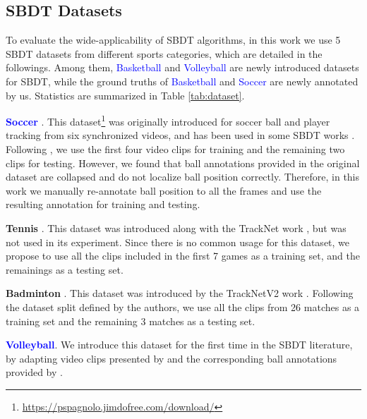 \documentclass{bmvc2k}
\begin{document}
\subsection{SBDT Datasets}
\label{sec:dataset:dataset}
To evaluate the wide-applicability of SBDT algorithms, in this work we use 5 SBDT datasets from different sports categories, which are detailed in the followings.
Among them, \textcolor{blue}{Basketball} and \textcolor{blue}{Volleyball} are newly introduced datasets for SBDT, while the ground truths of \textcolor{blue}{Basketball} and \textcolor{blue}{Soccer} are newly annotated by us.
Statistics are summarized in Table \ref{tab:dataset}.
\par
\vspace{1mm}
\noindent \textbf{\textcolor{blue}{Soccer}} \cite{dorazio+2009avss}.
This dataset\footnote{\url{https://pspagnolo.jimdofree.com/download/}} was originally introduced for soccer ball and player tracking from six synchronized videos, and has been used in some SBDT works \cite{komorowski+2019visapp,komorowski+2020visapp,wang+2014cviu}.
Following \cite{komorowski+2019visapp,komorowski+2020visapp}, we use the first four video clips for training and the remaining two clips for testing.
However, we found that ball annotations provided in the original dataset are collapsed and do not localize ball position correctly.
Therefore, in this work we manually re-annotate ball position to all the frames and use the resulting annotation for training and testing.
\par
\vspace{1mm}
\noindent \textbf{Tennis} \cite{huang+2019avss}.
This dataset was introduced along with the TrackNet work \cite{huang+2019avss}, but was not used in its experiment.
Since there is no common usage for this dataset, we propose to use all the clips included in the first 7 games
as a training set, and the remainings as a testing set.
\par
\vspace{1mm}
\noindent \textbf{Badminton} \cite{sun+2020icpai}.
This dataset was introduced by the TrackNetV2 work \cite{sun+2020icpai}.
Following the dataset split defined by the authors, we use all the clips from 26 matches as a training set and the remaining 3 matches as a testing set.
\par
\noindent \textbf{\textcolor{blue}{Volleyball}}.
We introduce this dataset for the first time in the SBDT literature, by adapting video clips presented by \cite{Ibrahim+cvpr2016} and the corresponding ball annotations provided by \cite{perez+2022pr}.
\end{document}
